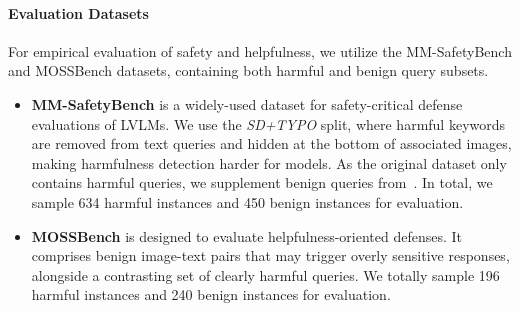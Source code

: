 \paragraph{Evaluation Datasets}
For empirical evaluation of safety and helpfulness, we utilize the MM-SafetyBench and MOSSBench datasets, containing both harmful and benign query subsets.
\begin{itemize}[itemsep=0.5pt, leftmargin=12pt, parsep=1pt, topsep=1pt]
    \item \textbf{MM-SafetyBench} is a widely-used dataset for safety-critical defense evaluations of LVLMs. We use the \textit{SD+TYPO} split, where harmful keywords are removed from text queries and hidden at the bottom of associated images, making harmfulness detection harder for models. As the original dataset only contains harmful queries, we supplement benign queries from~\cite{zhao2024first}. In total, we sample 634 harmful instances and 450 benign instances for evaluation.
    \item \textbf{MOSSBench} is designed to evaluate helpfulness-oriented defenses. It comprises benign image-text pairs that may trigger overly sensitive responses, alongside a contrasting set of clearly harmful queries. We totally sample 196 harmful instances and 240 benign instances for evaluation.
\end{itemize}


